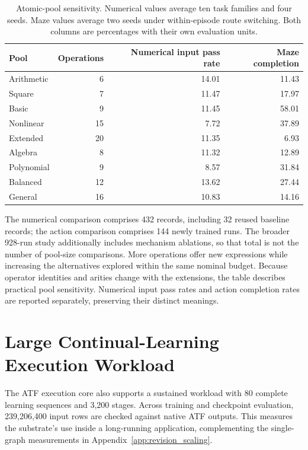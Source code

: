 \begin{table}[tb]
\centering
\small
\caption{Atomic-pool sensitivity. Numerical values average ten task families
and four seeds. Maze values average two seeds under within-episode route
switching. Both columns are percentages with their own evaluation units.}
\label{tab:revision_pool_full}
\begin{tabular}{lrrr}
\toprule
Pool & Operations & Numerical input pass rate & Maze completion \\
\midrule
Arithmetic & 6 & 14.01 & 11.43 \\
Square & 7 & 11.47 & 17.97 \\
Basic & 9 & 11.45 & 58.01 \\
Nonlinear & 15 & 7.72 & 37.89 \\
Extended & 20 & 11.35 & 6.93 \\
Algebra & 8 & 11.32 & 12.89 \\
Polynomial & 9 & 8.57 & 31.84 \\
Balanced & 12 & 13.62 & 27.44 \\
General & 16 & 10.83 & 14.16 \\
\bottomrule
\end{tabular}
\end{table}

The numerical comparison comprises 432 records, including 32 reused baseline
records; the action comparison comprises 144 newly trained runs. The broader
928-run study additionally includes mechanism ablations, so that total is not
the number of pool-size comparisons. More operations offer new expressions
while increasing the alternatives explored within the same nominal budget.
Because operator identities and arities change with the extensions, the table
describes practical pool sensitivity. Numerical input pass rates and action
completion rates are reported separately, preserving their distinct meanings.

\section{Large Continual-Learning Execution Workload}
\label{app:revision_large}

The ATF execution core also supports a sustained workload with 80 complete
learning sequences and 3,200 stages. Across training and checkpoint evaluation,
239,206,400 input rows are checked against native ATF outputs. This measures
the substrate's use inside a long-running application, complementing the
single-graph measurements in Appendix~\ref{app:revision_scaling}.

